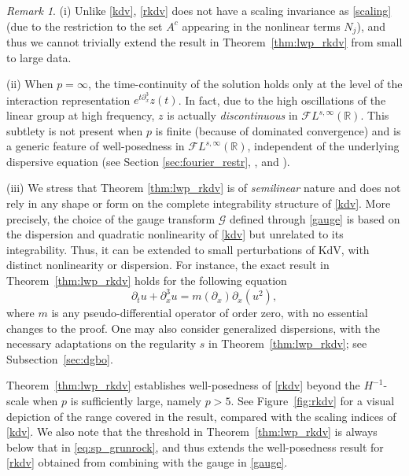 \documentclass[a4paper,
11pt,  reqno]{amsart}
\newcommand{\5}{\textup{V}}
\newcommand{\noi}{\noindent}
\newcommand{\FL}{\mathcal{F} L}
\newcommand{\dx}{\partial_x}
\theoremstyle{remark}
\newtheorem{remark}[theorem]{Remark}
\newcommand{\R}{\mathbb{R}}
\newcommand{\Gc}{\mathcal{G}}
\numberwithin{equation}{section}
\numberwithin{theorem}{section}
\begin{document}
\begin{remark}
\noi(i)
Unlike \eqref{kdv}, \eqref{rkdv} does not have a scaling invariance as \eqref{scaling} (due to the restriction to the set $A^c$ appearing in the nonlinear terms $N_j$), and thus we cannot trivially extend the result in Theorem~\ref{thm:lwp_rkdv} from small to large data.


\smallskip

\label{remark:Linfty_continuity}
\noi (ii) When $p=\infty$, the time-continuity of the solution holds only at the level of the interaction representation $e^{t\dx^3}z(t)$. In fact, due to the high oscillations of the linear group at high frequency, $z$ is actually \emph{discontinuous} in $\FL^{s,\infty}(\R)$. This subtlety is not present when $p$ is finite (because of dominated convergence) and is a generic feature of well-posedness in $\FL^{s,\infty}(\R)$, independent of the underlying dispersive equation (see Section \ref{sec:fourier_restr}, \cite[Section 7]{CC24}, and \cite[Remark~1.4.6]{Forlano}).


\smallskip

\noi(iii)
We stress that Theorem \ref{thm:lwp_rkdv} is of \emph{semilinear} nature and does not rely in any shape or form on the complete integrability structure of \eqref{kdv}.
		More precisely, the choice of the gauge transform $\Gc$ defined through \eqref{gauge} is based on the dispersion and quadratic nonlinearity of \eqref{kdv} but unrelated to its integrability. Thus, it can be extended to small perturbations of KdV, with distinct nonlinearity or dispersion. For instance, the exact result in Theorem~\ref{thm:lwp_rkdv} holds for the following equation
		\begin{equation}
			\partial_t u + \partial_x^3 u = m(\partial_x)\partial_x(u^2),
		\end{equation}
		where $m$ is any pseudo-differential operator of order zero,
        with no essential changes to the proof.
 One may also consider generalized dispersions, with the necessary adaptations on the regularity $s$ in Theorem~\ref{thm:lwp_rkdv}; see Subsection~\ref{sec:dgbo}.


\end{remark}

Theorem~\ref{thm:lwp_rkdv} establishes well-posedness of \eqref{rkdv} beyond the $H^{-1}$-scale when $p$ is sufficiently large, namely $p>{5}$. See Figure~\ref{fig:rkdv} for a visual depiction of the range covered in the result, compared with the scaling indices of \eqref{kdv}.
We also note that the threshold in Theorem~\ref{thm:lwp_rkdv} is always below that in \eqref{eq:sp_grunrock}, and thus extends the well-posedness result for \eqref{rkdv} obtained from combining \cite{Grunrock_ldv_hier} with the gauge in \eqref{gauge}.
\end{document}
